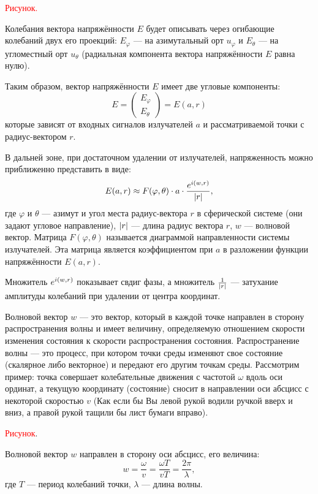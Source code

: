 \textcolor{red}{Рисунок.}

Колебания вектора напряжённости $E$ будет описывать через огибающие колебаний двух его проекций: $E_\varphi$ --- на азимутальный орт $u_\varphi$
и $E_\theta$ --- на угломестный орт $u_\theta$ (радиальная компонента вектора напряжённости $E$ равна нулю).

Таким образом, вектор напряжённости $E$ имеет две угловые компоненты:
\[
    E =
    \begin{pmatrix}
        E_\varphi \\
        E_\theta
    \end{pmatrix}
    = E(a, r)
\]
которые зависят от входных сигналов излучателей $a$ и рассматриваемой точки с радиус-вектором $r$.

В дальней зоне, при достаточном удалении от излучателей, напряженность можно приближенно представить в виде:
\begin{equation}
    \label{emission:diagram:tension}
    E(a, r) \approx F(\varphi, \theta) \cdot a \cdot \frac{e^{i \left ( w, r \right )}}{\left | r \right |},
\end{equation}
где $\varphi$ и $\theta$ --- азимут и угол места радиус-вектора $r$ в сферической системе (они задают угловое направление),
$\left | r \right |$ --- длина радиус вектора $r$, $w$ --- волновой вектор. Матрица $F(\varphi, \theta)$ называется диаграммой направленности
системы излучателей. Эта матрица является коэффициентом при $a$ в разложении функции напряжённости $E(a, r)$.

Множитель $e^{i \left ( w, r \right )}$ показывает свдиг фазы, а множитель $\frac{1}{\left | r \right |}$ --- затухание амплитуды
колебаний при удалении от центра координат.

Волновой вектор $w$ --- это вектор, который в каждой точке направлен в сторону распространения волны и имеет величину, определяемую отношением
скорости изменения состояния к скорости распространения состояния. Распространение волны --- это процесс, при котором точки среды изменяют свое состояние
(скалярное либо векторное) и передают его другим точкам среды. Рассмотрим пример: точка совершает колебательные движения с частотой $\omega$
вдоль оси ординат, а текущую координату (состояние) сносит в направлении оси абсцисс с некоторой скоростью $v$ (Как если бы Вы левой рукой водили
ручкой вверх и вниз, а правой рукой тащили бы лист бумаги вправо).

\textcolor{red}{Рисунок}.

Волновой вектор $w$ направлен в сторону оси абсцисс, его величина:
\[
    w
    = \frac{\omega}{v}
    = \frac{\omega T}{v T}
    = \frac{2 \pi}{\lambda} ,
\]
где $T$ --- период колебаний точки, $\lambda$ --- длина волны.

